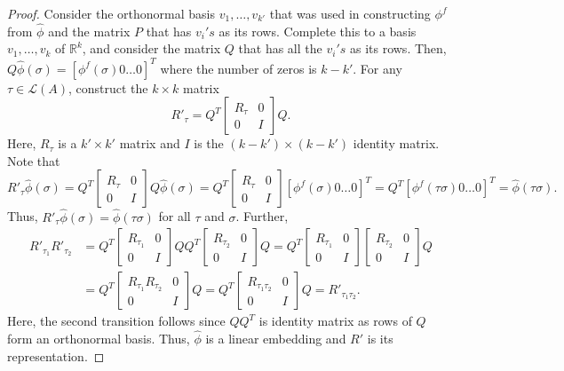 \documentclass[10pt,letterpaper]{article}
\newcommand{\calL}{{\mathcal{L}}}
\newcommand{\rank}{{\calL(A)}}
\begin{document}
\begin{proof}
Consider the orthonormal basis $v_1,\ldots,v_{k'}$ that was used in constructing $\phi^f$ from $\hat{\phi}$ and the matrix $P$ that has $v_i's$ as its rows. Complete this to a basis $v_1,\ldots,v_k$ of $\mathbb{R}^k$, and consider the matrix $Q$ that has all the $v_i's$ as its rows. Then, $Q \hat{\phi}(\sigma) = [\phi^f(\sigma) 0 \ldots 0]^T$ where the number of zeros is $k-k'$. For any $\tau \in \rank$, construct the $k \times k$ matrix 
$$
R'_{\tau} = Q^T \left[ \begin{smallmatrix} R_{\tau} & 0 \\ 0 & I \end{smallmatrix} \right] Q. 
$$
Here, $R_{\tau}$ is a $k' \times k'$ matrix and $I$ is the $(k-k') \times (k-k')$ identity matrix. Note that 
$$
R'_{\tau} \hat{\phi}(\sigma) = Q^T \left[ \begin{smallmatrix} R_{\tau} & 0 \\ 0 & I \end{smallmatrix} \right] Q \hat{\phi}(\sigma) = Q^T \left[ \begin{smallmatrix} R_{\tau} & 0 \\ 0 & I \end{smallmatrix} \right] [\phi^f(\sigma) 0 \ldots 0]^T = Q^T [\phi^f(\tau \sigma) 0 \ldots 0]^T = \hat{\phi}(\tau \sigma).
$$
Thus, $R'_{\tau} \hat{\phi}(\sigma) = \hat{\phi}(\tau \sigma)$ for all $\tau$ and $\sigma$. Further, 
\begin{align*}
R'_{\tau_1} R'_{\tau_2} &= Q^T \left[ \begin{smallmatrix} R_{\tau_1} & 0 \\ 0 & I \end{smallmatrix} \right] Q Q^T \left[ \begin{smallmatrix} R_{\tau_2} & 0 \\ 0 & I \end{smallmatrix} \right] Q = Q^T \left[ \begin{smallmatrix} R_{\tau_1} & 0 \\ 0 & I \end{smallmatrix} \right] \left[ \begin{smallmatrix} R_{\tau_2} & 0 \\ 0 & I \end{smallmatrix} \right] Q \\
&= Q^T \left[ \begin{smallmatrix} R_{\tau_1} R_{\tau_2} & 0 \\ 0 & I \end{smallmatrix} \right] Q = Q^T \left[ \begin{smallmatrix} R_{\tau_1 \tau_2} & 0 \\ 0 & I \end{smallmatrix} \right] Q = R'_{\tau_1 \tau_2}.
\end{align*}
Here, the second transition follows since $Q Q^T$ is identity matrix as rows of $Q$ form an orthonormal basis. Thus, $\hat{\phi}$ is a linear embedding and $R'$ is its representation.
\end{proof}
\end{document}
